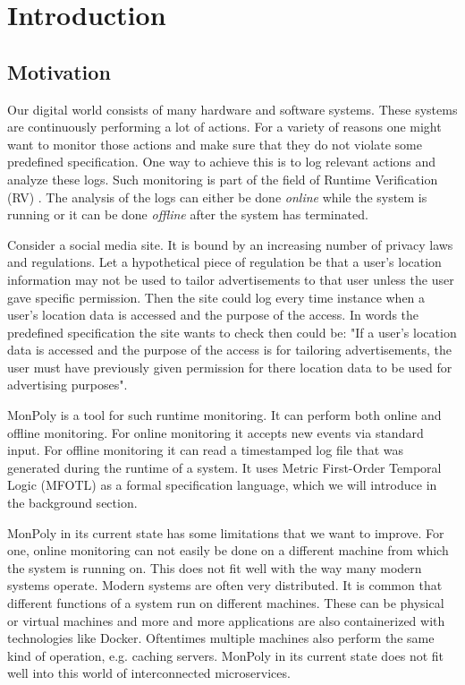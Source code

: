 \chapter{Introduction}

\section{Motivation}

Our digital world consists of many hardware and software systems.
These systems are continuously performing a lot of actions.
For a variety of reasons one might want to monitor those actions and make sure that they do not violate some predefined specification.
One way to achieve this is to log relevant actions and analyze these logs.
Such monitoring is part of the field of Runtime Verification (RV) \cite{Bartocci2018}.
The analysis of the logs can either be done \textit{online} while the system is running or it can be done \textit{offline} after the system has terminated.

Consider a social media site.
It is bound by an increasing number of privacy laws and regulations.
Let a hypothetical piece of regulation be that a user's location information may not be used to tailor advertisements to that user unless the user gave specific permission.
Then the site could log every time instance when a user's location data is accessed and the purpose of the access.
In words the predefined specification the site wants to check then could be:
    "If a user's location data is accessed and the purpose of the access is for tailoring advertisements, the user must have previously given permission for there location data to be used for advertising purposes".

MonPoly \cite{Basin2017} is a tool for such runtime monitoring.
It can perform both online and offline monitoring.
For online monitoring it accepts new events via standard input.
For offline monitoring it can read a timestamped log file that was generated during the runtime of a system.
It uses Metric First-Order Temporal Logic (MFOTL) \cite{Basin2008, Basin2015, Chomicki1995} as a formal specification language, which we will introduce in the background section.

MonPoly in its current state has some limitations that we want to improve.
For one, online monitoring can not easily be done on a different machine from which the system is running on.
This does not fit well with the way many modern systems operate.
Modern systems are often very distributed.
It is common that different functions of a system run on different machines.
These can be physical or virtual machines and more and more applications are also containerized with technologies like Docker.
Oftentimes multiple machines also perform the same kind of operation, e.g. caching servers.
MonPoly in its current state does not fit well into this world of interconnected microservices.

